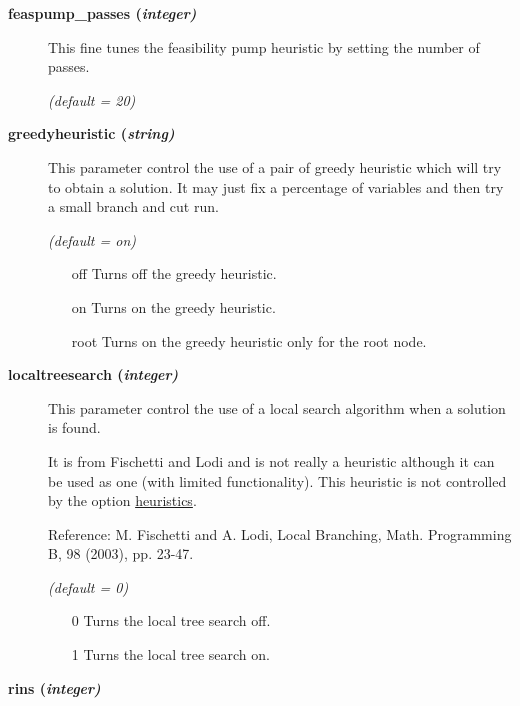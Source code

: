 \begin{description}
\item[\label{feaspump_passes}\hypertarget{feaspump_passes}
{\textbf{feaspump\_passes (\slshape{integer})}}]\hspace{1.0in}

This fine tunes the feasibility pump heuristic by setting the number of passes.

\textsl{(default = 20)}

\item[\label{greedyheuristic}\hypertarget{greedyheuristic}
{\textbf{greedyheuristic (\slshape{string})}}]\hspace{1.0in}

This parameter control the use of a pair of greedy heuristic which will try to obtain a solution.
It may just fix a percentage of variables and then try a small branch and cut run.

\textsl{(default = on)}
\begin{itemize}
\item[off] 
Turns off the greedy heuristic.
\item[on] 
Turns on the greedy heuristic.
\item[root] 
Turns on the greedy heuristic only for the root node.
\end{itemize}

\item[\label{localtreesearch}\hypertarget{localtreesearch}
{\textbf{localtreesearch (\slshape{integer})}}]\hspace{1.0in}

This parameter control the use of a local search algorithm when a solution is found.

It is from Fischetti and Lodi and is not really a heuristic although it can be used as one (with limited functionality).
This heuristic is not controlled by the option \hyperlink{heuristics}{heuristics}.

Reference: M. Fischetti and A. Lodi, Local Branching, Math. Programming B, 98 (2003), pp. 23-47.

\textsl{(default = 0)}
\begin{itemize}
\item[0] 
Turns the local tree search off.
\item[1] 
Turns the local tree search on.
\end{itemize}

\item[\label{rins}\hypertarget{rins}
{\textbf{rins (\slshape{integer})}}]\hspace{1.0in}


\end{description}
